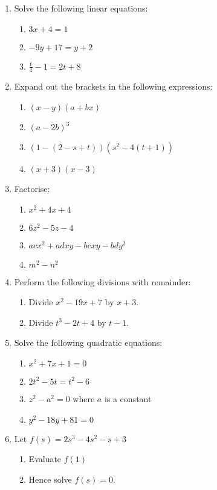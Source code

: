 \documentclass{article}
\begin{document}
\begin{enumerate}
\item Solve the following linear equations:
	\begin{enumerate}
	\item $3x+4=1$
	\item $-9y+17=y+2$
	\item $\frac{t}{4}-1=2t+8$
	\end{enumerate}
\item Expand out the brackets in the following expressions:
	\begin{enumerate}
	\item $(x-y)(a+bx)$
	\item $(a-2b)^3$
	\item $(1-(2-s+t))(s^2-4(t+1))$
	\item $(x+3)(x-3)$
	\end{enumerate}
\item Factorise:
	\begin{enumerate}
	\item $x^2+4x+4$
	\item $6z^2-5z-4$
	\item $acx^2 + adxy -bcxy -bdy^2$
	\item $m^2-n^2$
	\end{enumerate}
\item Perform the following divisions with remainder:
	\begin{enumerate}
	\item Divide $x^2-19x+7$ by $x+3$.
	\item Divide $t^3-2t+4$ by $t-1$.
	\end{enumerate}
\item Solve the following quadratic equations:
	\begin{enumerate}
	\item $x^2+7x+1=0$
	\item $2t^2-5t=t^2-6$
	\item $z^2-a^2=0$ where $a$ is a constant
	\item $y^2-18y+81=0$
	\end{enumerate}
\item Let $f(s)=2s^3-4s^2-s+3$
	\begin{enumerate}
	\item Evaluate $f(1)$
	\item Hence solve $f(s)=0$.
	\end{enumerate}
\end{enumerate}
\end{document}
